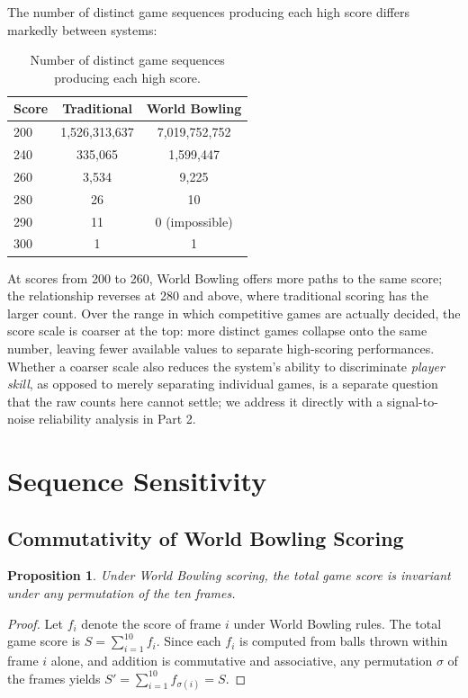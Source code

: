 \documentclass[USenglish]{article}
\theoremstyle{dgthm}
\newtheorem{proposition}{Proposition}
\theoremstyle{dgdef}
\begin{document}
The number of distinct game sequences producing each high score differs markedly between systems:

\begin{table}[!ht]
\caption{Number of distinct game sequences producing each high score.}
\begin{tabular}{lcc}
Score & Traditional & World Bowling \\ \midrule
200 & 1,526,313,637 & 7,019,752,752 \\
240 & 335,065 & 1,599,447 \\
260 & 3,534 & 9,225 \\
280 & 26 & 10 \\
290 & 11 & 0 (impossible) \\
300 & 1 & 1 \\
\end{tabular}
\label{tab:compression}
\end{table}

At scores from 200 to 260, World Bowling offers more paths to the same score; the relationship reverses at 280 and above, where traditional scoring has the larger count. Over the range in which competitive games are actually decided, the score scale is coarser at the top: more distinct games collapse onto the same number, leaving fewer available values to separate high-scoring performances. Whether a coarser scale also reduces the system's ability to discriminate \emph{player skill}, as opposed to merely separating individual games, is a separate question that the raw counts here cannot settle; we address it directly with a signal-to-noise reliability analysis in Part 2.


\section{Sequence Sensitivity}

\subsection{Commutativity of World Bowling Scoring}

\begin{proposition}\label{prop:commutativity}
Under World Bowling scoring, the total game score is invariant under any permutation of the ten frames.
\end{proposition}

\begin{proof}
Let $f_i$ denote the score of frame $i$ under World Bowling rules. The total game score is $S = \sum_{i=1}^{10} f_i$. Since each $f_i$ is computed from balls thrown within frame $i$ alone, and addition is commutative and associative, any permutation $\sigma$ of the frames yields $S' = \sum_{i=1}^{10} f_{\sigma(i)} = S$.
\end{proof}
\end{document}
